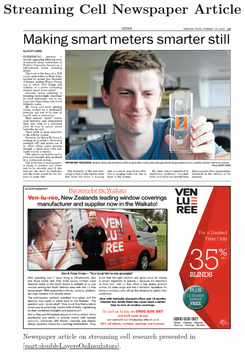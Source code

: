    \chapter{Streaming Cell Newspaper Article}
   \begin{figure}
       \centering
       \includegraphics[width=\textwidth]{content/appendices/Article}
       \caption{Newspaper article on streaming cell research presented in \cref{part:doubleLayersOnInsulators}.}
   \end{figure}






